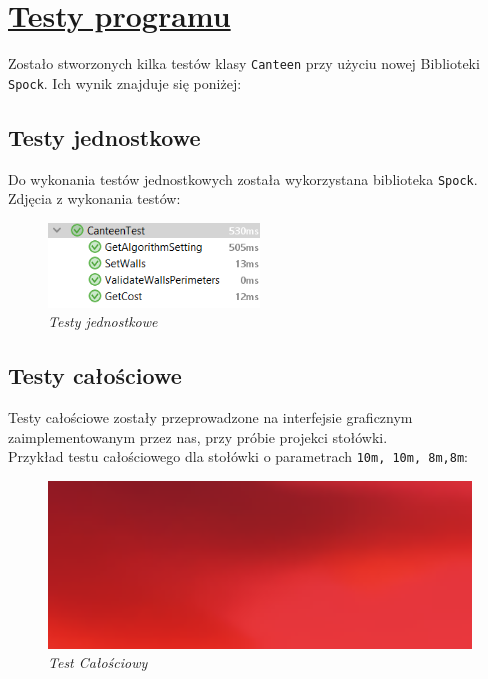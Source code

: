 \documentclass{article}
\begin{document}
\section{\underline{Testy programu}}
\indent Zostało stworzonych kilka testów klasy \verb|Canteen| przy użyciu nowej Biblioteki \verb|Spock|. Ich wynik znajduje się poniżej:
\subsection{Testy jednostkowe}
\indent Do wykonania testów jednostkowych została wykorzystana biblioteka \verb|Spock|. 
Zdjęcia z wykonania testów:\\
\vspace{1cm}
\begin{figure}[h]
		\hspace*{2.7cm} 
			\includegraphics[width=0.5\textwidth]{CanteenTest.png}
				\caption[Testy jednostkowe] {{\sl Testy jednostkowe}}
				
		\end{figure}
\newpage

\subsection{Testy całościowe}
\indent Testy całościowe zostały przeprowadzone na interfejsie graficznym zaimplementowanym przez nas, przy próbie projekci stołówki.\\
 Przykład testu całościowego dla stołówki o parametrach \verb|10m, 10m, 8m,8m|:
\vspace{1cm}

\begin{figure}[h]
\hspace*{-1.5cm} 
\includegraphics[width=1.2\textwidth]{TestCalosciowyGen.png}
\caption[Test Całościowy] {{\sl Test Całościowy}}
\end{figure}
\end{document}
